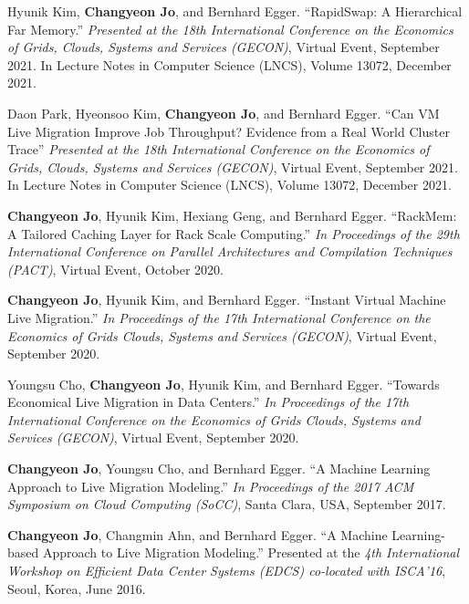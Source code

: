 \documentclass[margin]{res}
\begin{document}
\begin{resume}
\par
Hyunik Kim, \textbf{Changyeon Jo}, and Bernhard Egger. ``RapidSwap: A Hierarchical Far Memory.'' \textit{Presented at the 18th International Conference on the Economics of Grids, Clouds, Systems and Services (GECON)}, Virtual Event, September 2021. In Lecture Notes in Computer Science (LNCS), Volume 13072, December 2021.

\par
Daon Park, Hyeonsoo Kim, \textbf{Changyeon Jo}, and Bernhard Egger. ``Can VM Live Migration Improve Job Throughput? Evidence from a Real World Cluster Trace'' \textit{Presented at the 18th International Conference on the Economics of Grids, Clouds, Systems and Services (GECON)}, Virtual Event, September 2021. In Lecture Notes in Computer Science (LNCS), Volume 13072, December 2021.

\par
\textbf{Changyeon Jo}, Hyunik Kim, Hexiang Geng, and Bernhard Egger. ``RackMem: A Tailored Caching Layer for Rack Scale Computing.'' \textit{In Proceedings of the 29th International Conference on Parallel Architectures and Compilation Techniques (PACT)}, Virtual Event, October 2020.

\par
\textbf{Changyeon Jo}, Hyunik Kim, and Bernhard Egger. ``Instant Virtual Machine Live Migration.'' \textit{In Proceedings of the 17th International Conference on the Economics of Grids Clouds, Systems and Services (GECON)}, Virtual Event, September 2020.

\vspace{-0.5em}
\par
Youngsu Cho, \textbf{Changyeon Jo}, Hyunik Kim, and Bernhard Egger. ``Towards Economical Live Migration in Data Centers.'' \textit{In Proceedings of the 17th International Conference on the Economics of Grids Clouds, Systems and Services (GECON)}, Virtual Event, September 2020.

\vspace{-0.5em}
\par
\textbf{Changyeon Jo}, Youngsu Cho, and Bernhard Egger. ``A Machine Learning Approach to Live Migration Modeling.'' \textit{In Proceedings of the 2017 ACM Symposium on Cloud Computing (SoCC)}, Santa Clara, USA, September 2017.

\vspace{-0.5em}
\par
\textbf{Changyeon Jo}, Changmin Ahn, and Bernhard Egger. ``A Machine Learning-based Approach to Live Migration Modeling.'' Presented at the \textit{4th International Workshop on Efficient Data Center Systems (EDCS) co-located with ISCA'16}, Seoul, Korea, June 2016.


\end{resume}
\end{document}
